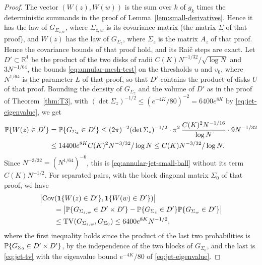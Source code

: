 \begin{proof}
The vector $(W(z),W(w))$ is the sum over $k$ of $g_k$ times the
deterministic summands in the proof of Lemma~\ref{lem:small-derivatives}.
Hence it has the law of $G_{\Sigma_{z,w}}$, where $\Sigma_{z,w}$ is its
covariance matrix (the matrix $\Sigma$ of that proof), and $W(z)$ has the
law of $G_{\Sigma_z}$, where $\Sigma_z$ is the matrix $A_z$ of that
proof.
Hence the covariance bounds of that proof hold, and its Rai\v{c} steps
are exact.
Let $D'\subset\mathbb R^4$ be the product of the two disks of radii
$C(K)N^{-1/32}/\sqrt{\log N}$ and $3N^{-1/64}$, the bounds
\eqref{eq:annular-mesh-test} on the thresholds $u$ and $v_0$, where
$N^{1/64}$ is the parameter $L$ of that proof, so that $D'$ contains the
product of disks $U$ of that proof. Bounding the density of
$G_{\Sigma_z}$ and the volume of $D'$ as in the proof of
Theorem~\ref{thm:T3}, with
$(\det\Sigma_z)^{-1/2}\le(e^{-4K}/80)^{-2}=6400e^{8K}$ by
\eqref{eq:jet-eigenvalue}, we get
\begin{align*}
 \mathbb P\{W(z)\in D'\}
 &=\mathbb P\{G_{\Sigma_z}\in D'\}
 \le(2\pi)^{-2}(\det\Sigma_z)^{-1/2}\cdot\pi^2\,
   \frac{C(K)^2N^{-1/16}}{\log N}\cdot9N^{-1/32}\\
 &\le14400e^{8K}C(K)^2N^{-3/32}/\log N
 \le C(K)N^{-3/32}/\log N.
\end{align*}
Since $N^{-3/32}=(N^{1/64})^{-6}$, this is
\eqref{eq:annular-jet-small-ball} without its term $C(K)N^{-1/2}$.
For separated pairs, with the block diagonal matrix $\Sigma_0$ of that
proof, we have
\begin{align*}
 &\bigl|\operatorname{Cov}(\mathbf 1\{W(z)\in D'\},\mathbf 1\{W(w)\in D'\})
 \bigr|\\
 &\qquad=\bigl|\mathbb P\{G_{\Sigma_{z,w}}\in D'\times D'\}
       -\mathbb P\{G_{\Sigma_z}\in D'\}\mathbb P\{G_{\Sigma_w}\in D'\}\bigr|\\
 &\qquad\le\operatorname{TV}(G_{\Sigma_{z,w}},G_{\Sigma_0})
 \le6400e^{8K}N^{-1/2},
\end{align*}
where the first inequality holds since the product of the last two
probabilities is
$\mathbb P\{G_{\Sigma_0}\in D'\times D'\}$, by the independence of the two
blocks of $G_{\Sigma_0}$, and the last is \eqref{eq:jet-tv} with the
eigenvalue bound $e^{-4K}/80$ of \eqref{eq:jet-eigenvalue}.


\end{proof}
